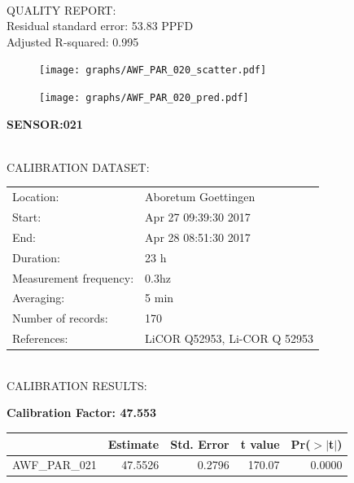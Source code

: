 \documentclass[oneside]{report}
\begin{document}
\hrulefill\\
QUALITY REPORT:\\
Residual standard error: 53.83 PPFD\\
Adjusted R-squared: 0.995



\begin{figure}[H]
  \centering
  \texttt{[image: graphs/AWF\_PAR\_020\_scatter.pdf]}
\end{figure}




\begin{figure}[H]
  \centering
  \texttt{[image: graphs/AWF\_PAR\_020\_pred.pdf]}
\end{figure}

\pagebreak


\begin{center}
\large{\textbf{SENSOR:021}}\\
\end{center}

\hrulefill\\
CALIBRATION DATASET:\\
\begin{table}[h!]
  \centering
  \label{tab:table1}
  \begin{tabular}{ll}
    Location: & Aboretum Goettingen\\ 
    
    
    Start:  & Apr 27 09:39:30 2017 \\
    End:   & Apr 28 08:51:30 2017\\ 
    Duration: & 23 h\\
    Measurement frequency: & 0.3hz\\
    Averaging:  &5 min\\
    Number of records: & 170 \\
    References: & LiCOR Q52953, Li-COR Q 52953 \\
  \end{tabular}
\end{table}

\hrulefill\\
CALIBRATION RESULTS:\\


\begin{center}
\textbf{\large{Calibration Factor: 47.553}}\\
\end{center}
\begin{table}[ht]
\centering
\begin{tabular}{rrrrr}
  \hline
 & Estimate & Std. Error & t value & Pr($>$$|$t$|$) \\ 
  \hline
AWF\_PAR\_021 & 47.5526 & 0.2796 & 170.07 & 0.0000 \\ 
   \hline
\end{tabular}
\end{table}
\end{document}
